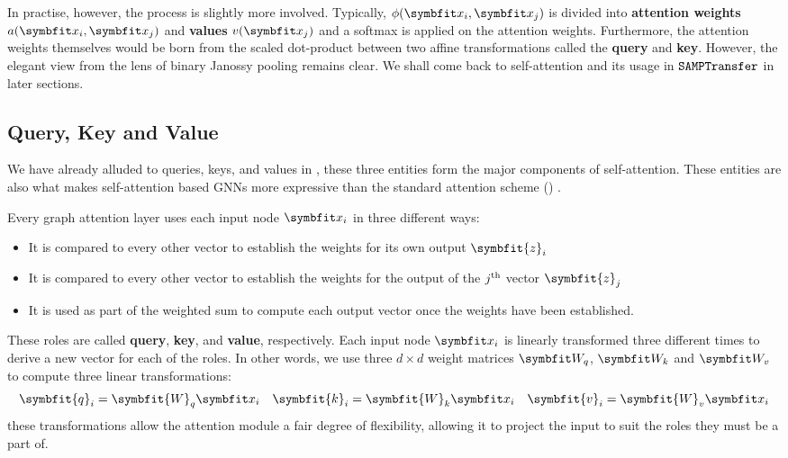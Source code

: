 In practise, however, the process is slightly more involved. Typically, $\phi(\bfitx_i, \bfitx_j)$ is divided into \textbf{attention weights} $a(\bfitx_i, \bfitx_j)$ and \textbf{values} $v(\bfitx_j)$ and a softmax is applied on the attention weights. Furthermore, the attention weights themselves would be born from the scaled dot-product between two affine transformations called the \textbf{query} and \textbf{key}.
However, the elegant view from the lens of binary Janossy pooling remains clear. We shall come back to self-attention and its usage in $\texttt{SAMPTransfer}$ in later sections.

\subsection{Query, Key and Value}\label{sec:attn-qkv}
We have already alluded to queries, keys, and values in , these three entities form the major components of self-attention. These entities are also what makes self-attention based GNNs more expressive than the standard attention scheme () \parencite{brody2021attentive, Bronstein2021, Dwivedi2020}.

Every graph attention layer uses each input node $\bfitx_i$ in three different ways:
\begin{itemize}
    \item It is compared to every other vector to establish the weights for its own output $\symbfit{z}_i$
    \item It is compared to every other vector to establish the weights for the output of the $j\textsuperscript{th}$ vector $\symbfit{z}_j$
    \item It is used as part of the weighted sum to compute each output vector once the weights have been established.
\end{itemize}

These roles are called \textbf{query}, \textbf{key}, and \textbf{value}, respectively. Each input node $\bfitx_i$ is linearly transformed three different times to derive a new vector for each of the roles. In other words, we use three $d\times d$ weight matrices $\Wq$, $\Wk$ and $\Wv$ to compute three linear transformations:
\begin{equation}
    \symbfit{q}_{i}=\symbfit{W}_{q} \bfitx_{i} \quad \symbfit{k}_{i}=\symbfit{W}_{k} \bfitx_{i} \quad \symbfit{v}_{i}=\symbfit{W}_{v} \bfitx_{i}
\end{equation}
these transformations allow the attention module a fair degree of flexibility, allowing it to project the input to suit the roles they must be a part of. 

